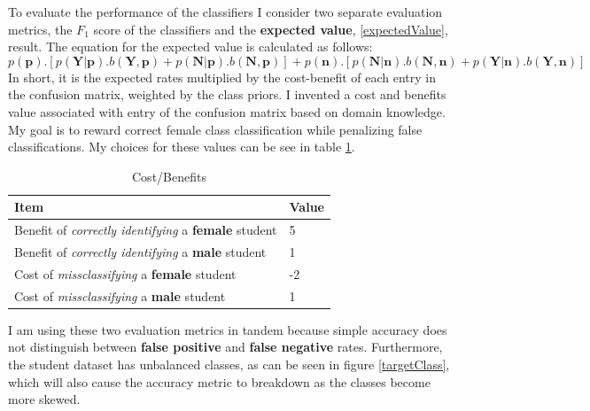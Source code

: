 To evaluate the performance of the classifiers I consider two separate evaluation metrics, the $F_1$ score of the classifiers and the \textbf{expected value}, \ref{expectedValue}, result. The equation for the expected value is calculated as follows:
$$ p(\mathbf{p}).[p(\mathbf{Y}|\mathbf{p}). b(\mathbf{Y},\mathbf{p}) + p(\mathbf{N}|\mathbf{p}). b(\mathbf{N},\mathbf{p})] + p(\mathbf{n}).[p(\mathbf{N}|\mathbf{n}). b(\mathbf{N},\mathbf{n}) + 
p(\mathbf{Y}|\mathbf{n}). b(\mathbf{Y},\mathbf{n})]$$
In short, it is the expected rates multiplied by the cost-benefit of each entry in the confusion matrix, weighted by the class priors. I invented a cost and benefits value associated with entry of the confusion matrix based on domain knowledge. My goal is to reward correct female class classification while penalizing false classifications. My choices for these values can be see in table \ref{tableCostBenefit}. 

\setlength{\extrarowheight}{1.5pt}
\begin{table}[!htbp]
\caption{Cost/Benefits} %
\centering %
\begin{tabular}{|l|l|} %
\hline %

\hline
Item & Value\\[0.5ex]
\hline %

Benefit of \textit{correctly identifying} a \textbf{female} student  & 5  \\
Benefit of \textit{correctly identifying} a \textbf{male} student   & 1  \\
Cost of \textit{missclassifying} a \textbf{female} student  & -2  \\
Cost of \textit{missclassifying} a \textbf{male} student  & 1  \\

\hline%
\end{tabular}
\label{tableCostBenefit}{}
\end{table}

I am using these two evaluation metrics in tandem because simple accuracy does not distinguish between \textbf{false positive} and \textbf{false negative} rates. Furthermore, the student dataset has unbalanced classes, as can be seen in figure \ref{targetClass}, which will also cause the accuracy metric to breakdown as the classes become more skewed.





